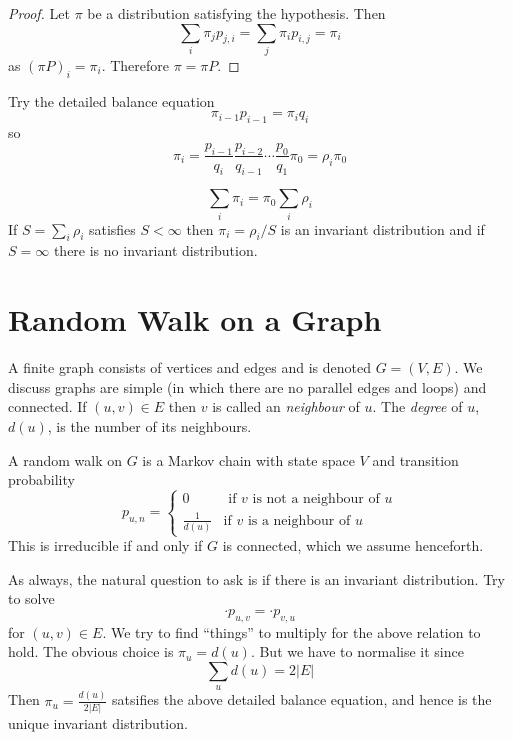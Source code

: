 \documentclass[a4paper]{article}
\begin{document}
\begin{proof}
  Let \(\pi\) be a distribution satisfying the hypothesis. Then
  \[
    \sum_i \pi_j p_{j, i} = \sum_j \pi_i p_{i, j} = \pi_i
  \]
  as \((\pi P)_i = \pi_i\). Therefore \(\pi = \pi P\).
\end{proof}

\begin{eg}
  Try the detailed balance equation
  \[
    \pi_{i - 1} p_{i - 1} = \pi_i q_i
  \]
  so
  \begin{equation}
    \pi_i = \frac{p_{i - 1}}{q_i} \frac{p_{i - 2}}{q_{i - 1}} \cdots \frac{p_0}{q_1} \pi_0 = \rho_i \pi_0
  \end{equation}

  \[
    \sum_i \pi_i = \pi_0 \sum_i \rho_i
  \]
  If \(S = \sum_i \rho_i\) satisfies \(S < \infty\) then \(\pi_i = \rho_i/S\) is an invariant distribution and if \(S = \infty\) there is no invariant distribution.
\end{eg}

\section{Random Walk on a Graph}

A finite graph consists of vertices and edges and is denoted \(G = (V, E)\). We discuss graphs are simple (in which there are no parallel edges and loops) and connected. If \((u, v) \in E\) then \(v\) is called an \emph{neighbour} of \(u\). The \emph{degree} of \(u\), \(d(u)\), is the number of its neighbours.

A random walk on \(G\) is a Markov chain with state space \(V\) and transition probability
\[
  p_{u, n} =
  \begin{cases}
    0 & \text{ if \(v\) is not a neighbour of \(u\)} \\
    \frac{1}{d(u)} & \text{if \(v\) is a neighbour of \(u\)}
  \end{cases}
\]
This is irreducible if and only if \(G\) is connected, which we assume henceforth.

As always, the natural question to ask is if there is an invariant distribution. Try to solve
\[
  \cdot p_{u, v} = \cdot p_{v, u}
\]
for \((u, v) \in E\). We try to find ``things'' to multiply for the above relation to hold. The obvious choice is \(\pi_u = d(u)\). But we have to normalise it since
\[
  \sum_u d(u) = 2|E|
\]
Then \(\pi_u = \frac{d(u)}{2|E|}\) satsifies the above detailed balance equation, and hence is the unique invariant distribution.
\end{document}
